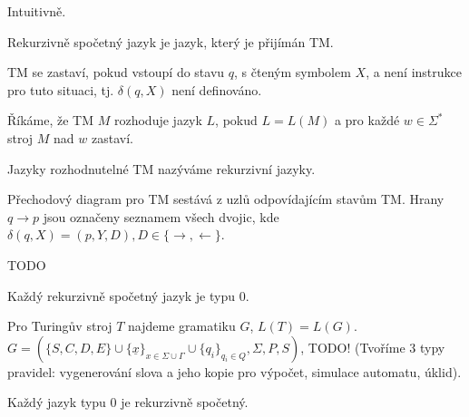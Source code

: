 \documentclass[12pt]{article}                   %
\begin{document}
    \begin{definice}
        Intuitivně.
    \end{definice}

    \begin{definice}
        Rekurzivně spočetný jazyk je jazyk, který je přijímán TM.
    \end{definice}

    \begin{definice}[TM se zastaví]
        TM se zastaví, pokud vstoupí do stavu $q$, s čteným symbolem $X$, a není instrukce pro tuto situaci, tj. $\delta(q, X)$ není definováno.
    \end{definice}

    \begin{definice}
        Říkáme, že TM $M$ rozhoduje jazyk $L$, pokud $L = L(M)$ a pro každé $w \in \Sigma^*$ stroj $M$ nad $w$ zastaví.

        Jazyky rozhodnutelné TM nazýváme rekurzivní jazyky.
    \end{definice}

    \begin{definice}
        Přechodový diagram pro TM sestává z uzlů odpovídajícím stavům TM. Hrany $q \rightarrow p$ jsou označeny seznamem všech dvojic, kde $\delta(q, X) = (p, Y, D), D \in \{\rightarrow, \leftarrow\}$.
    \end{definice}


    TODO

    \begin{veta}
        Každý rekurzivně spočetný jazyk je typu 0.

        \begin{dukazin}
            Pro Turingův stroj $T$ najdeme gramatiku $G$, $L(T) = L(G)$. $G = (\{S, C, D, E\} \cup \{\underline{x}\}_{x \in \Sigma\cup\Gamma}\cup \{q_i\}_{q_i \in Q}, \Sigma, P, S)$, TODO! (Tvoříme 3 typy pravidel: vygenerování slova a jeho kopie pro výpočet, simulace automatu, úklid).
        \end{dukazin}
    \end{veta}

    \begin{dukazin}
        Každý jazyk typu 0 je rekurzivně spočetný.
    \end{dukazin}
\end{document}
